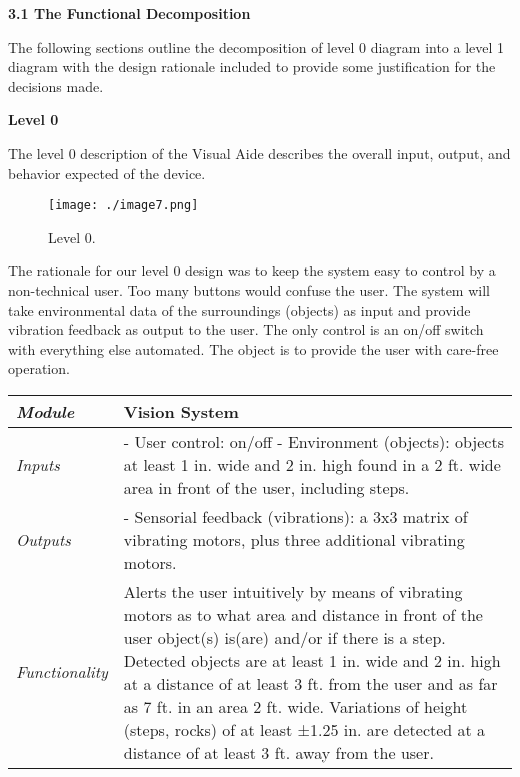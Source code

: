 \textbf{3.1 The Functional Decomposition}


The following sections outline the decomposition of level 0 diagram into
a level 1 diagram with the design rationale included to provide some
justification for the decisions made.



\textbf{Level 0}

The level 0 description of the Visual Aide describes the overall input,
output, and behavior expected of the device.

\begin{figure}
\texttt{[image: ./image7.png]}
\caption{Level 0.}
\label{figure:caseStudyLevel0}
\end{figure}


The rationale for our level 0 design was to keep the system easy to
control by a non-technical user. Too many buttons would confuse the
user. The system will take environmental data of the surroundings
(objects) as input and provide vibration feedback as output to the user.
The only control is an on/off switch with everything else automated. The
object is to provide the user with care-free operation.


\begin{table}

\label{table:caseStudyLevel0}
\begin{tabular}{|m{3cm}|m{10cm}|} \hline

\emph{Module} & Vision System \\ \hline

\emph{Inputs} & - User control: on/off
- Environment (objects): objects at least 1 in. wide and 2 in. high
found in a 2 ft. wide area in front of the user, including steps. \\ \hline

\emph{Outputs} & - Sensorial feedback (vibrations): a 3x3 matrix of
vibrating motors, plus three additional vibrating motors. \\ \hline

\emph{Functionality} & Alerts the user intuitively by means of vibrating
motors as to what area and distance in front of the user object(s)
is(are) and/or if there is a step. Detected objects are at least 1 in.
wide and 2 in. high at a distance of at least 3 ft. from the user and as
far as 7 ft. in an area 2 ft. wide. Variations of height (steps, rocks)
of at least ±1.25 in. are detected at a distance of at least 3 ft. away
from the user. \\ \hline
\end{tabular}
\end{table}

